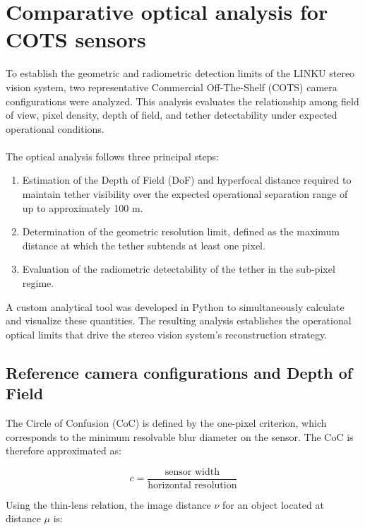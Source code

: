 \section{Comparative optical analysis for COTS sensors}

To establish the geometric and radiometric detection limits of the LINKU stereo vision system, two representative Commercial Off-The-Shelf (COTS) camera configurations were analyzed. This analysis evaluates the relationship among field of view, pixel density, depth of field, and tether detectability under expected operational conditions.
\\\\
The optical analysis follows three principal steps:

\begin{enumerate}
    \item Estimation of the Depth of Field (DoF) and hyperfocal distance required to maintain tether visibility over the expected operational separation range of up to approximately 100 m.
    \item Determination of the geometric resolution limit, defined as the maximum distance at which the tether subtends at least one pixel.
    \item Evaluation of the radiometric detectability of the tether in the sub-pixel regime.
\end{enumerate}

A custom analytical tool was developed in Python to simultaneously calculate and visualize these quantities. The resulting analysis establishes the operational optical limits that drive the stereo vision system's reconstruction strategy.

\subsection{Reference camera configurations and Depth of Field}

The Circle of Confusion (CoC) is defined by the one-pixel criterion, which corresponds to the minimum resolvable blur diameter on the sensor. The CoC is therefore approximated as:

\begin{equation}
c = \frac{\text{sensor width}}{\text{horizontal resolution}}
\label{eq:pixel-size}
\end{equation}

Using the thin-lens relation, the image distance $\nu$ for an object located at distance $\mu$ is:

